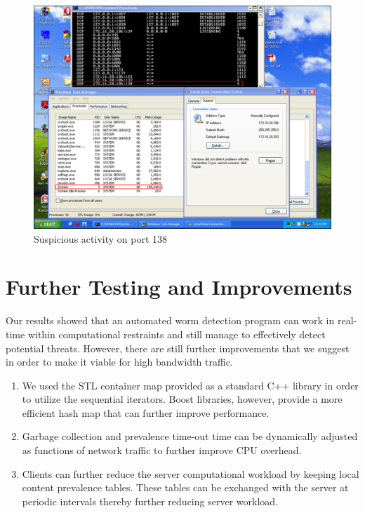 \documentclass{report}
\begin{document}
\begin{figure}[here]
\centering
\includegraphics[width=\textwidth]{Port138WindowsSuspicious.png}
\caption{Suspicious activity on port 138}
\label{Infected138}
\end{figure}

\chapter{Further Testing and Improvements}
Our results showed that an automated worm detection program can work in real-time within computational restraints and still manage to effectively detect potential threats. However, there are still further improvements that we suggest in order to make it viable for high bandwidth traffic.
\begin{enumerate}
\item We used the STL container map provided as a standard C++ library in order to utilize the sequential iterators. Boost libraries, however, provide a more efficient hash map that can further improve performance.
\item Garbage collection and prevalence time-out time can be dynamically adjusted as functions of network traffic to further improve CPU overhead.
\item Clients can further reduce the server computational workload by keeping local content prevalence tables. These tables can be exchanged with the server at periodic intervals thereby further reducing server workload.
\end{enumerate}

\nocite{*}

\end{document}
